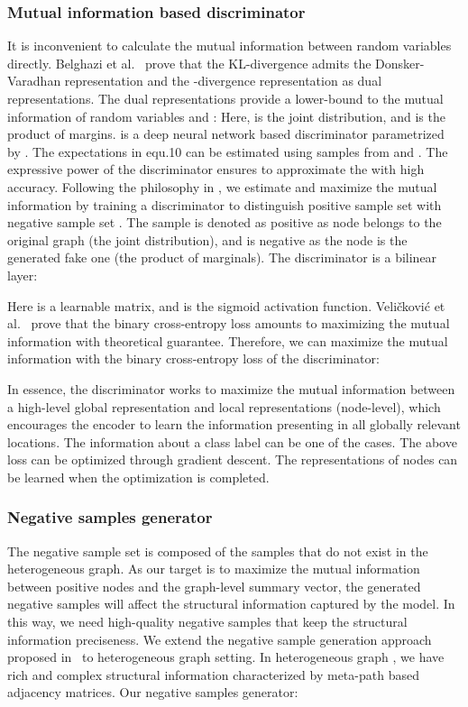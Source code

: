 \documentclass[conference]{IEEEtran}
\begin{document}
\subsubsection{Mutual information based discriminator}
It is inconvenient to calculate the mutual information between random variables directly. 
	Belghazi et al.~\cite{BBROBCD18} prove that the KL-divergence admits the Donsker-Varadhan representation and the -divergence representation as dual representations. The dual representations provide a lower-bound to the mutual information of random variables  and :
\label{eq:mi}	
Here,  is the joint distribution, and  is the product of margins.  is a deep neural network based discriminator parametrized by . The expectations in equ.10 can be estimated using samples from  and . The expressive power of the discriminator ensures to approximate the  with high accuracy. 
	Following the philosophy in \cite{HFMGBTB19}, we estimate and maximize the mutual information by training a discriminator  to distinguish positive sample set  with negative sample set . The sample  is denoted as positive as node  belongs to the original graph (the joint distribution), and  is negative as the node  is the generated fake one (the product of marginals). The discriminator  is a bilinear layer:
	
	
	
Here  is a learnable matrix, and  is the sigmoid activation function.
	Veli{\v{c}}kovi{\'c} et al.~\cite{velivckovic2018deep} prove that the binary cross-entropy loss amounts to maximizing the mutual information with theoretical guarantee.
Therefore, we can maximize the mutual information with the binary cross-entropy loss of the discriminator:
		


	In essence, the discriminator works to maximize the mutual information between a high-level global representation and local representations (node-level), which encourages the encoder to learn the information presenting in all globally relevant locations. The information about a class label can be one of the cases. The above loss can be optimized through gradient descent. The representations of nodes can be learned when the optimization is completed. 
	
\subsubsection{Negative samples generator}\label{sec:nsg}	
The negative sample set  is composed of the samples that do not exist in the heterogeneous graph. As our target is to maximize the mutual information between positive nodes and the graph-level summary vector, the generated negative samples will affect the structural information captured by the model. In this way, we need high-quality negative samples that keep the structural information preciseness. We extend the negative sample generation approach proposed in~\cite{velivckovic2018deep} to heterogeneous graph setting. 
	In heterogeneous graph , we have rich and complex structural information characterized by meta-path based adjacency matrices. Our negative samples generator:
	
\end{document}
